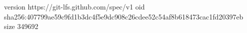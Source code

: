 version https://git-lfs.github.com/spec/v1
oid sha256:407799ae59c9fd1b3dc4f5e9dc908c26cdee52c54af8b618473cac1fd20397eb
size 349692
